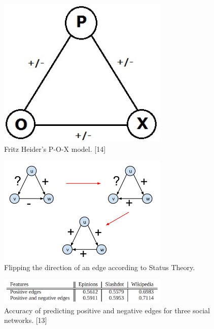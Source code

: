 \documentclass[conference,letterpaper]{IEEEtran}
\begin{document}
\begin{center}
\begin{figure}[hb]
\centering
\includegraphics[width=3.2in]{pox}
\caption{
Fritz Heider's P-O-X model. [14]
}
\label{fig_sim}
\end{figure}
\end{center}

\begin{center}
\begin{figure}[hb]
\centering
\includegraphics[width=3.2in]{status_theory}
\caption{
Flipping the direction of an edge according to Status Theory.
}
\label{fig_sim}
\end{figure}
\end{center}

\begin{center}
\begin{figure}[hb]
\centering
\includegraphics[width=3.2in]{predicting_positive}
\caption{
Accuracy of predicting positive and negative edges for three social networks. [13]
}
\label{fig_sim}
\end{figure}
\end{center}
\end{document}

